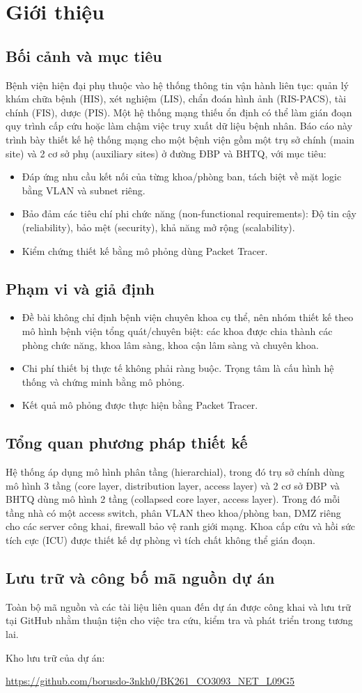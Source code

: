 \section{Giới thiệu}

\subsection{Bối cảnh và mục tiêu}
Bệnh viện hiện đại phụ thuộc vào hệ thống thông tin vận hành liên tục: quản lý khám chữa bệnh (HIS), xét nghiệm (LIS), chẩn đoán hình ảnh (RIS-PACS), tài chính (FIS), dược (PIS). Một hệ thống mạng thiếu ổn định có thể làm gián đoạn quy trình cấp cứu hoặc làm chậm việc truy xuất dữ liệu bệnh nhân. Báo cáo này trình bày thiết kế hệ thống mạng cho một bệnh viện gồm một trụ sở chính (main site) và 2 cơ sở phụ (auxiliary sites) ở đường ĐBP và BHTQ, với mục tiêu:
\begin{itemize}
    \item Đáp ứng nhu cầu kết nối của từng khoa/phòng ban, tách biệt về mặt logic bằng VLAN và subnet riêng.
    \item Bảo đảm các tiêu chí phi chức năng (non-functional requirements): Độ tin cậy (reliability), bảo mệt (security), khả năng mở rộng (scalability).
    \item Kiểm chứng thiết kế bằng mô phỏng dùng Packet Tracer.
\end{itemize}

\subsection{Phạm vi và giả định}
\begin{itemize}
    \item Đề bài không chỉ định bệnh viện chuyên khoa cụ thể, nên nhóm thiết kế theo mô hình bệnh viện tổng quát/chuyên biệt: các khoa được chia thành các phòng chức năng, khoa lâm sàng, khoa cận lâm sàng và chuyên khoa.
    \item Chi phí thiết bị thực tế không phải ràng buộc. Trọng tâm là cấu hình hệ thống và chứng minh bằng mô phỏng.
    \item Kết quả mô phỏng được thực hiện bằng Packet Tracer.
\end{itemize}

\subsection{Tổng quan phương pháp thiết kế}
Hệ thống áp dụng mô hình phân tầng (hierarchial), trong đó trụ sở chính dùng mô hình 3 tầng (core layer, distribution layer, access layer) và 2 cơ sở ĐBP và BHTQ dùng mô hình 2 tầng (collapsed core layer, access layer). Trong đó mỗi tầng nhà có một access switch, phân VLAN theo khoa/phòng ban, DMZ riêng cho các server công khai, firewall bảo vệ ranh giới mạng. Khoa cấp cứu và hồi sức tích cực (ICU) được thiết kế dự phòng vì tích chất không thể gián đoạn.

\subsection{Lưu trữ và công bố mã nguồn dự án}

Toàn bộ mã nguồn và các tài liệu liên quan đến dự án
được công khai và lưu trữ tại GitHub nhằm thuận tiện
cho việc tra cứu, kiểm tra và phát triển trong tương lai.

Kho lưu trữ của dự án:

\url{https://github.com/borusdo-3nkh0/BK261_CO3093_NET_L09G5}